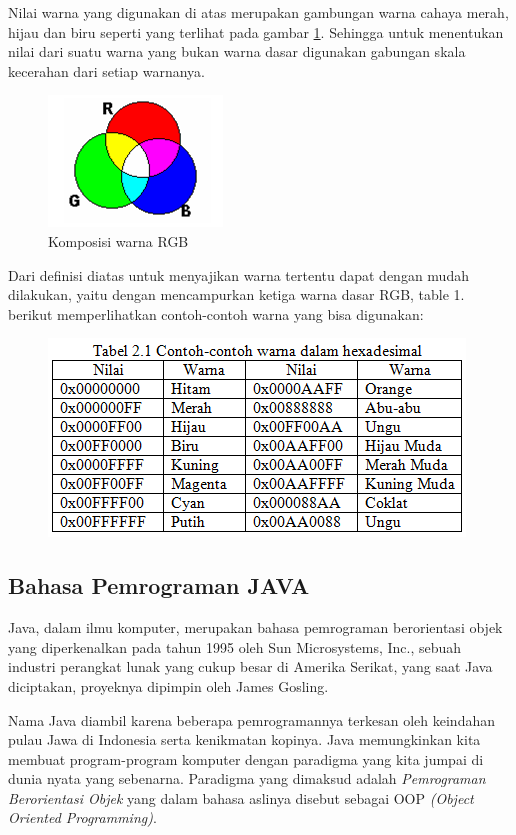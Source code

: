 \documentclass{jtetiproposalskripsi}
\begin{document}
Nilai warna yang digunakan di atas merupakan gambungan warna cahaya merah, hijau dan biru seperti yang terlihat pada gambar \ref{rgb}. Sehingga untuk menentukan nilai dari suatu warna yang bukan warna dasar digunakan gabungan skala kecerahan dari setiap warnanya.

\begin{figure}[ht!]
  \centering
    \includegraphics{gambar/rgb}
    \caption{Komposisi warna RGB}
    \label{rgb}
\end{figure}

Dari definisi diatas untuk menyajikan warna tertentu dapat dengan mudah dilakukan, yaitu dengan mencampurkan ketiga warna dasar RGB, table 1. berikut memperlihatkan contoh-contoh warna yang bisa digunakan:

\begin{figure}[ht!]
  \centering
    \includegraphics{gambar/tabelwarna}
    \label{tabelwarna}
\end{figure}

\subsection{Bahasa Pemrograman JAVA}
Java, dalam ilmu komputer, merupakan bahasa pemrograman berorientasi objek yang diperkenalkan pada tahun 1995 oleh Sun Microsystems, Inc., sebuah industri perangkat lunak yang cukup besar di Amerika Serikat, yang saat Java diciptakan, proyeknya dipimpin oleh James Gosling. 

Nama Java diambil karena beberapa pemrogramannya terkesan oleh keindahan pulau Jawa di Indonesia serta kenikmatan kopinya. Java memungkinkan kita membuat program-program komputer dengan paradigma yang kita jumpai di dunia nyata yang sebenarna. Paradigma yang dimaksud adalah \emph{Pemrograman Berorientasi Objek} yang dalam bahasa aslinya disebut sebagai OOP \emph{(Object Oriented Programming)}.
\end{document}
